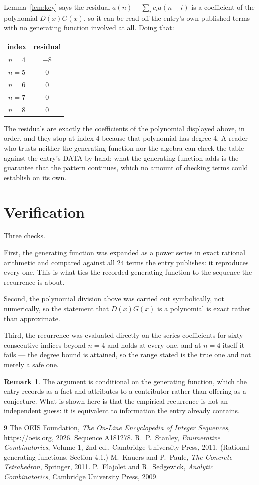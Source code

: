 \documentclass[11pt,a4paper]{article}
\theoremstyle{plain}
\theoremstyle{definition}
\newtheorem{remark}[theorem]{Remark}
\begin{document}
Lemma~\ref{lem:key} says the residual $a(n)-\sum_ic_ia(n-i)$ is a coefficient of the
polynomial $D(x)G(x)$, so it can be read off the entry's own published terms with no
generating function involved at all. Doing that:
\begin{center}
\begin{tabular}{cc}
index & residual \\ \hline
$n=4$ & $-8$ \\
$n=5$ & $0$ \\
$n=6$ & $0$ \\
$n=7$ & $0$ \\
$n=8$ & $0$
\end{tabular}
\end{center}
The residuals are exactly the coefficients of the polynomial displayed above, in order, and
they stop at index $4$ because that polynomial has degree $4$. A reader who trusts
neither the generating function nor the algebra can check the table against the entry's DATA
by hand; what the generating function adds is the guarantee that the pattern continues, which
no amount of checking terms could establish on its own.

\section{Verification}

Three checks.

First, the generating function was expanded as a power series in exact rational arithmetic and
compared against all $24$ terms the entry publishes: it reproduces every one. This is
what ties the recorded generating function to the sequence the recurrence is about.

Second, the polynomial division above was carried out symbolically, not numerically, so the
statement that $D(x)G(x)$ is a polynomial is exact rather than approximate.

Third, the recurrence was evaluated directly on the series coefficients for sixty consecutive
indices beyond $n=4$ and holds at every one, and at $n=4$ itself it fails --- the
degree bound is attained, so the range stated is the true one and not merely a safe one.

\begin{remark}
The argument is conditional on the generating function, which the entry records as a fact and
attributes to a contributor rather than offering as a conjecture. What is shown here is that
the empirical recurrence is not an independent guess: it is equivalent to information the
entry already contains.
\end{remark}

\begin{thebibliography}{9}
 The OEIS Foundation, \emph{The On-Line Encyclopedia of Integer
Sequences}, \url{https://oeis.org}, 2026. Sequence A181278.
 R.~P.~Stanley, \emph{Enumerative Combinatorics}, Volume 1, 2nd ed.,
Cambridge University Press, 2011. (Rational generating functions, Section 4.1.)
 M.~Kauers and P.~Paule, \emph{The Concrete Tetrahedron}, Springer, 2011.
 P.~Flajolet and R.~Sedgewick, \emph{Analytic Combinatorics}, Cambridge
University Press, 2009.
\end{thebibliography}
\end{document}
